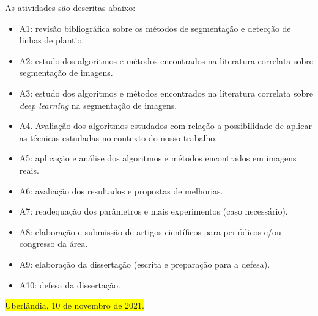 \documentclass[12pt, a4paper, english, brazil]{article}
\newcommand{\boxYellow}[1]{\colorbox{yellow}{#1}}
\begin{document}
As atividades são descritas abaixo:

\begin{itemize}
    \item A1: revisão bibliográfica sobre os métodos de segmentação e detecção de linhas de plantio.
    \item A2: estudo dos algoritmos e métodos encontrados na literatura correlata sobre segmentação de imagens.
    \item A3: estudo dos algoritmos e métodos encontrados na literatura correlata sobre \textit{deep learning} na segmentação de imagens.
    \item A4. Avaliação dos algoritmos estudados com relação a possibilidade de aplicar as técnicas estudadas no contexto do nosso trabalho.
    \item A5: aplicação e análise dos algoritmos e métodos encontrados em imagens reais.
    \item A6: avaliação dos resultados e propostas de melhorias.
    \item A7: readequação dos parâmetros e mais experimentos (caso necessário).
    \item A8: elaboração e submissão de artigos científicos para periódicos e/ou congresso da área.
    \item A9: elaboração da dissertação (escrita e preparação para a defesa).
    \item A10: defesa da dissertação.
\end{itemize}



\bigskip
\noindent \boxYellow{Uberlândia, 10 de novembro de 2021.}


\end{document}
